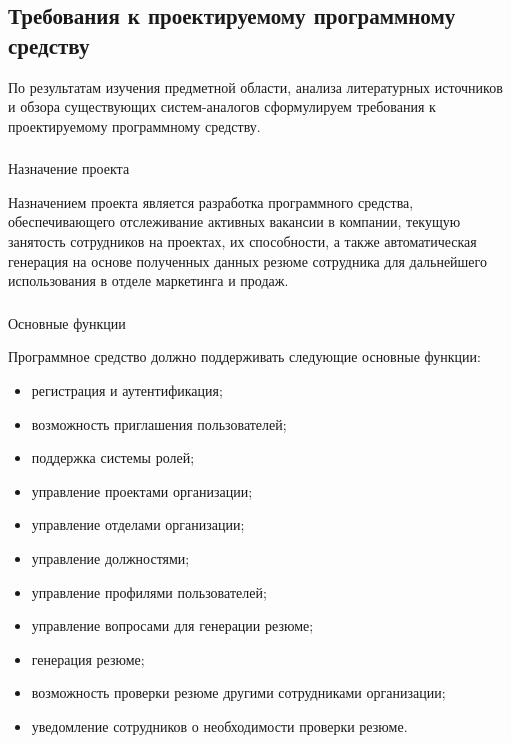 \subsection{Требования к проектируемому программному средству}
\label{sec:analysis:specification}

По результатам изучения предметной области, анализа литературных источников и обзора существующих систем-аналогов
сформулируем требования к проектируемому программному средству.
\pagebreak

\subsubsection{} Назначение проекта
\label{sec:analysis:specification:purpose}

Назначением проекта является разработка программного средства, \linebreak обеспечивающего отслеживание
активных вакансии в компании, текущую занятость сотрудников на проектах, их способности, а также автоматическая генерация
на основе полученных данных резюме сотрудника для дальнейшего использования в отделе маркетинга и продаж.

\subsubsection{} Основные функции
\label{sec:analysis:specification:functions}

Программное средство должно поддерживать следующие основные фун\-к\-ции:

\begin{itemize}
	\item регистрация и аутентификация;
	\item возможность приглашения пользователей;
	\item поддержка системы ролей;
	\item управление проектами организации;
	\item управление отделами организации;
	\item управление должностями;
	\item управление профилями пользователей;
	\item управление вопросами для генерации резюме;
	\item генерация резюме;
	\item возможность проверки резюме другими сотрудниками организации;
	\item уведомление сотрудников о необходимости проверки резюме.
\end{itemize}

